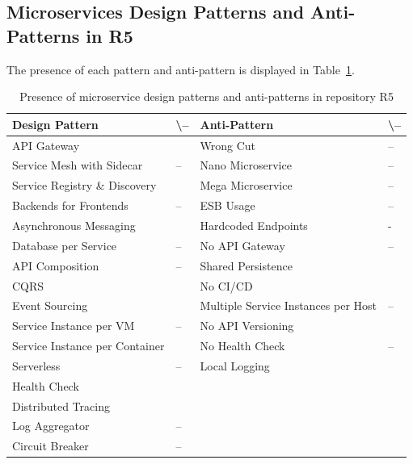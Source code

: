 \documentclass{Configuration_Files/PoliMi3i_thesis}
\newcommand{\cmark}{\ding{51}}%
\begin{document}
\subsection{Microservices Design Patterns and Anti-Patterns in R5}
\label{subsec:R5_detection}

The presence of each pattern and anti-pattern is displayed in Table~\ref{table:R5_result}.

\begin{table}[H]
\centering 
    \begin{tabular}{ 
  | >{\centering\arraybackslash} m{16em} 
  | >{\centering\arraybackslash} m{2.2em} 
  | >{\centering\arraybackslash} m{16em} 
  | >{\centering\arraybackslash} m{2.2em} | }
    \hline
    \rowcolor{bluepoli!40}
    \textbf{Design Pattern} & \cmark \textbackslash – & \textbf{Anti-Pattern} & \cmark \textbackslash – \T\B \\
    \hline \hline
    API Gateway & \cmark & Wrong Cut & – \T\B\\
    \hline
    \rowcolor{bluepoli!10}
    Service Mesh with Sidecar & – & Nano Microservice & – \T\B \\
    \hline
    Service Registry \& Discovery & \cmark & Mega Microservice & – \T\B \\
    \hline
    \rowcolor{bluepoli!10}
    Backends for Frontends & – & ESB Usage & – \T\B \\
    \hline
    Asynchronous Messaging & \cmark & Hardcoded Endpoints & - \T\B \\
    \hline
    \rowcolor{bluepoli!10}
    Database per Service & – & No API Gateway & – \T\B \\
    \hline
    API Composition & – & Shared Persistence & \cmark \T\B \\
    \hline
    \rowcolor{bluepoli!10}
    CQRS & \cmark & No CI/CD & \cmark \T\B \\
    \hline
    Event Sourcing & \cmark & Multiple Service Instances per Host & – \T\B \\
    \hline
    \rowcolor{bluepoli!10}
    Service Instance per VM & – & No API Versioning & \cmark \T\B \\
    \hline
    Service Instance per Container & \cmark & No Health Check & – \T\B \\
    \hline
    \rowcolor{bluepoli!10}
    Serverless & – & Local Logging & \cmark \T\B \\
    \hline
    Health Check & \cmark &  & \T\B \\
    \hline
    \rowcolor{bluepoli!10}
    Distributed Tracing & \cmark & & \T\B \\
    \hline
    Log Aggregator & – &  & \T\B \\
    \hline
    \rowcolor{bluepoli!10}
    Circuit Breaker & – &  & \T\B \\
    \hline
    \end{tabular}
    \\[10pt]
    \caption{Presence of microservice design patterns and anti-patterns in repository R5}
    \label{table:R5_result}
\end{table}
\end{document}
